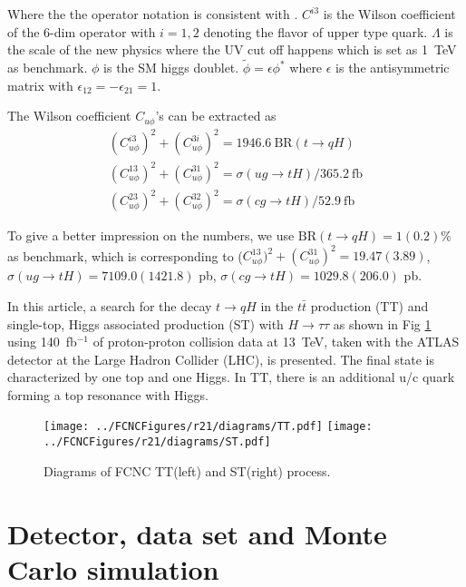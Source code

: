 Where the the operator notation is consistent with \cite{fcnc_production_theory}. $C^{i3}$ is the Wilson coefficient of the 6-dim operator with $i=1,2$ denoting the flavor of upper type quark. $\Lambda$ is the scale of the new physics where the UV cut off happens which is set as 1~TeV as benchmark. $\phi$ is the SM higgs doublet. $\tilde{\phi}=\epsilon\phi^\ast$ where $\epsilon$ is the antisymmetric matrix with $\epsilon_{12}=-\epsilon_{21}=1$.

The Wilson coefficient $C_{u\phi}$'s can be extracted as
\begin{equation}
\begin{array}{l}
(C^{i3}_{u\phi})^2 + (C^{3i}_{u\phi})^2 = 1946.6~\text{BR}(t\to qH)\\
(C^{13}_{u\phi})^2 + (C^{31}_{u\phi})^2 = \sigma(ug\to tH)/365.2~\text{fb}\\
(C^{23}_{u\phi})^2 + (C^{32}_{u\phi})^2 = \sigma(cg\to tH)/52.9~\text{fb}
\end{array}
\label{eq:eq02}
\end{equation}

To give a better impression on the numbers, we use $\text{BR}(t\to qH)=1(0.2)\%$ as benchmark, which is corresponding to ($C^{13}_{u\phi})^2 + (C^{31}_{u\phi})^2=19.47(3.89)$, $\sigma(ug\to tH)=7109.0(1421.8)$ pb, $\sigma(cg\to tH)=1029.8(206.0)$ pb.

In this article, a search for the decay $t\to qH$ in the $t\bar{t}$ production (TT) and single-top, Higgs associated production (ST) with $H\to\tau\tau$  as shown in Fig \ref{fig:diagrams} using 140~fb$^{-1}$ of proton-proton collision data at 13~TeV, taken with the ATLAS detector at the Large Hadron Collider (LHC), is presented. The final state is characterized by one top and one Higgs. In TT, there is an additional u/c quark forming a top resonance with Higgs.

\begin{figure}[htb]
\centering
\texttt{[image: ../FCNCFigures/r21/diagrams/TT.pdf]}
\texttt{[image: ../FCNCFigures/r21/diagrams/ST.pdf]}\\
\caption{ Diagrams of FCNC TT(left) and ST(right) process. }
\label{fig:diagrams}
\end{figure}


\section{Detector, data set and Monte Carlo simulation}

